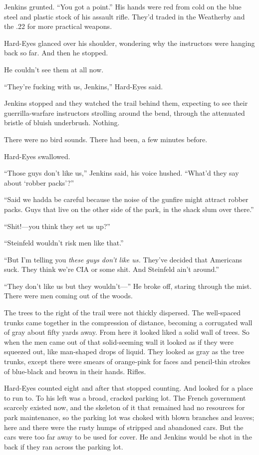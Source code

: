 Jenkins grunted. ``You got a point.'' His hands were red from cold on the blue steel and plastic stock of his assault rifle. They'd traded in the Weatherby and the .22 for more practical weapons.

Hard-Eyes glanced over his shoulder, wondering why the instructors were hanging back so far. And then he stopped.

He couldn't see them at all now.

``They're fucking with us, Jenkins,'' Hard-Eyes said.

Jenkins stopped and they watched the trail behind them, expecting to see their guerrilla-warfare instructors strolling around the bend, through the attenuated bristle of bluish underbrush. Nothing.

There were no bird sounds. There had been, a few minutes before.

Hard-Eyes swallowed.

``Those guys don't like us,'' Jenkins said, his voice hushed. ``What'd they say about ‘robber packs'?''

``Said we hadda be careful because the noise of the gunfire might attract robber packs. Guys that live on the other side of the park, in the shack slum over there.''

``Shit!---you think they set us up?''

``Steinfeld wouldn't risk men like that.''

``But I'm telling you \textit{these guys don't like us.} They've decided that Americans suck. They think we're CIA or some shit. And Steinfeld ain't around.''

``They don't like us but they wouldn't---'' He broke off, staring through the mist. There were men coming out of the woods.

The trees to the right of the trail were not thickly dispersed. The well-spaced trunks came together in the compression of distance, becoming a corrugated wall of gray about fifty yards away. From here it looked liked a solid wall of trees. So when the men came out of that solid-seeming wall it looked as if they were squeezed out, like man-shaped drops of liquid. They looked as gray as the tree trunks, except there were smears of orange-pink for faces and pencil-thin strokes of blue-black and brown in their hands. Rifles.

Hard-Eyes counted eight and after that stopped counting. And looked for a place to run to. To his left was a broad, cracked parking lot. The French government scarcely existed now, and the skeleton of it that remained had no resources for park maintenance, so the parking lot was choked with blown branches and leaves; here and there were the rusty humps of stripped and abandoned cars. But the cars were too far away to be used for cover. He and Jenkins would be shot in the back if they ran across the parking lot.

